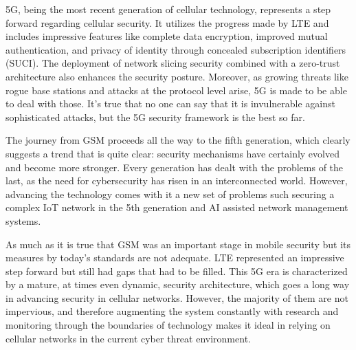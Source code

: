 \documentclass[conference]{IEEEtran}
\begin{document}
5G, being the most recent generation of cellular technology, represents a step forward regarding cellular security. It utilizes the progress made by LTE and includes impressive features like complete data encryption, improved mutual authentication, and privacy of identity through concealed subscription identifiers (SUCI). The deployment of network slicing security combined with a zero-trust architecture also enhances the security posture. Moreover, as growing threats like rogue base stations and attacks at the protocol level arise, 5G is made to be able to deal with those. It’s true that no one can say that it is invulnerable against sophisticated attacks, but the 5G security framework is the best so far.

The journey from GSM proceeds all the way to the fifth generation, which clearly suggests a trend that is quite clear: security mechanisms have certainly evolved and become more stronger. Every generation has dealt with the problems of the last, as the need for cybersecurity has risen in an interconnected world. However, advancing the technology comes with it a new set of problems such securing a complex IoT network in the 5th generation and AI assisted network management systems.

As much as it is true that GSM was an important stage in mobile security but its measures by today’s standards are not adequate. LTE represented an impressive step forward but still had gaps that had to be filled. This 5G era is characterized by a mature, at times even dynamic, security architecture, which goes a long way in advancing security in cellular networks. However, the majority of them are not impervious, and therefore augmenting the system constantly with research and monitoring through the boundaries of technology makes it ideal in relying on cellular networks in the current cyber threat environment.




\end{document}
